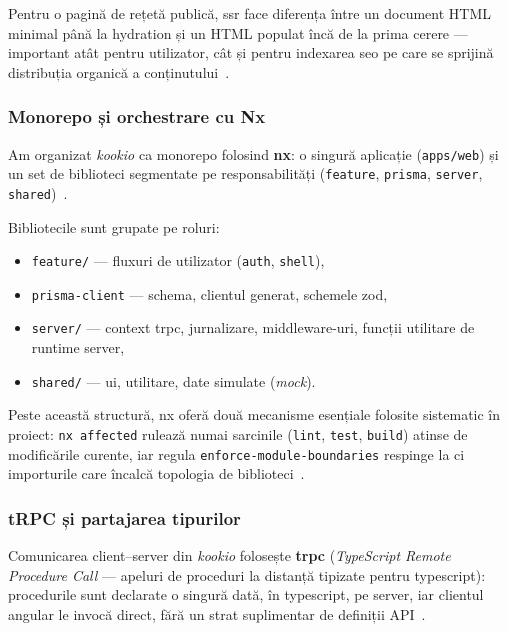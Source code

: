 Pentru o pagină de rețetă publică, \acrshort{ssr} face diferența între un document HTML minimal până la \gls{hydration} și un HTML populat încă de la prima cerere --- important atât pentru utilizator, cât și pentru indexarea \acrshort{seo} pe care se sprijină distribuția organică a conținutului~\cite{analog}.

\subsubsection{Monorepo și orchestrare cu Nx}\label{subsec:monorepo-nx}

Am organizat \textit{\gls{kookio}} ca \gls{monorepo} folosind \textbf{\gls{nx}}: o singură aplicație (\texttt{apps/web}) și un set de biblioteci segmentate pe responsabilități (\texttt{feature}, \texttt{prisma}, \texttt{server}, \texttt{shared})~\cite{nx}.

Bibliotecile sunt grupate pe roluri:
\begin{itemize}
  \item \texttt{feature/} --- fluxuri de utilizator (\texttt{auth}, \texttt{shell}),
  \item \texttt{prisma-client} --- schema, clientul generat, schemele \gls{zod},
  \item \texttt{server/} --- context \gls{trpc}, jurnalizare, middleware-uri, funcții utilitare de runtime server,
  \item \texttt{shared/} --- \acrshort{ui}, utilitare, date simulate (\textit{mock}).
\end{itemize}

Peste această structură, \gls{nx} oferă două mecanisme esențiale folosite sistematic în proiect: \texttt{nx affected} rulează numai sarcinile (\texttt{lint}, \texttt{test}, \texttt{build}) atinse de modificările curente, iar regula \texttt{enforce-module-boundaries} respinge la \acrshort{ci} importurile care încalcă topologia de biblioteci~\cite{nx}.

\subsubsection{tRPC și partajarea tipurilor}\label{subsec:trpc}

Comunicarea client--server din \textit{\gls{kookio}} folosește \textbf{\gls{trpc}} (\textit{TypeScript Remote Procedure Call} --- apeluri de proceduri la distanță tipizate pentru \gls{typescript}): procedurile sunt declarate o singură dată, în \gls{typescript}, pe server, iar clientul \gls{angular} le invocă direct, fără un strat suplimentar de definiții API~\cite{trpc}.

